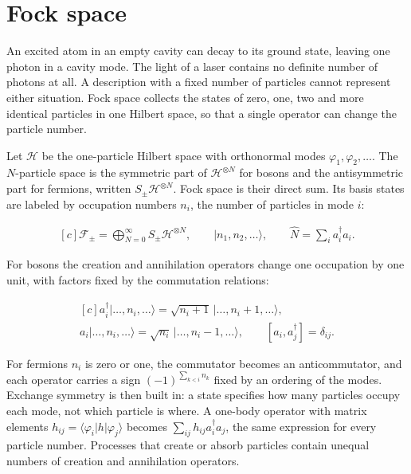 \documentclass[11pt,oneside]{book}
\newenvironment{centeredalign}{\[\begin{gathered}[c]}{\end{gathered}\]}
\newcommand{\ket}[1]{\lvert #1\rangle}
\begin{document}
\clearpage

\section{Fock space}

\label{topic:fock-space}

An excited atom in an empty cavity can decay to its ground state, leaving one photon in a cavity mode. The light of a laser contains no definite number of photons at all. A description with a fixed number of particles cannot represent either situation. Fock space collects the states of zero, one, two and more identical particles in one Hilbert space, so that a single operator can change the particle number.

Let \(\mathcal H\) be the one-particle Hilbert space with orthonormal modes \(\varphi_1,\varphi_2,\dots\). The \(N\)-particle space is the symmetric part of \(\mathcal H^{\otimes N}\) for bosons and the antisymmetric part for fermions, written \(S_\pm\mathcal H^{\otimes N}\). Fock space is their direct sum. Its basis states are labeled by occupation numbers \(n_i\), the number of particles in mode \(i\):

\begin{centeredalign}
\mathcal F_\pm=\bigoplus_{N=0}^{\infty}S_\pm\mathcal H^{\otimes N},\qquad
\ket{n_1,n_2,\dots},\qquad \hat N=\sum_ia_i^\dagger a_i.
\end{centeredalign}

For bosons the creation and annihilation operators change one occupation by one unit, with factors fixed by the commutation relations:

\begin{centeredalign}
a_i^\dagger\ket{\dots,n_i,\dots}=\sqrt{n_i+1}\,\ket{\dots,n_i+1,\dots},\\
a_i\ket{\dots,n_i,\dots}=\sqrt{n_i}\,\ket{\dots,n_i-1,\dots},\qquad
[a_i,a_j^\dagger]=\delta_{ij}.
\end{centeredalign}

For fermions \(n_i\) is zero or one, the commutator becomes an anticommutator, and each operator carries a sign \((-1)^{\sum_{k<i}n_k}\) fixed by an ordering of the modes. Exchange symmetry is then built in: a state specifies how many particles occupy each mode, not which particle is where. A one-body operator with matrix elements \(h_{ij}=\langle\varphi_i|h|\varphi_j\rangle\) becomes \(\sum_{ij}h_{ij}a_i^\dagger a_j\), the same expression for every particle number. Processes that create or absorb particles contain unequal numbers of creation and annihilation operators.
\end{document}
